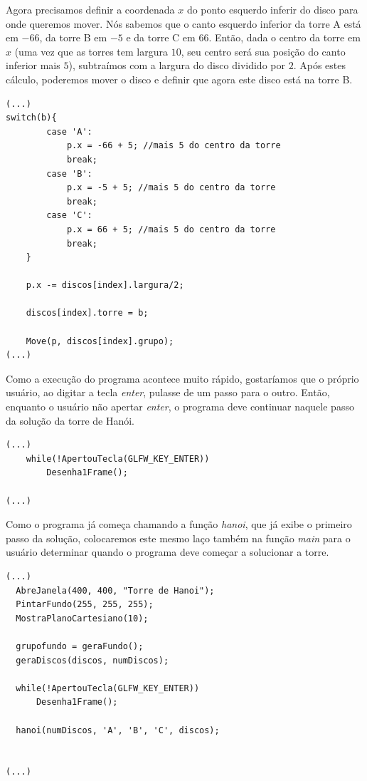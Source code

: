 Agora precisamos definir a coordenada $x$ do ponto esquerdo inferir do disco para onde queremos mover. Nós sabemos que o canto esquerdo inferior da torre A está em $-66$, da torre B em $-5$ e da torre C em $66$. Então, dada o centro da torre em $x$ (uma vez que as torres tem largura $10$, seu centro será sua posição do canto inferior mais $5$), subtraímos com a largura do disco dividido por $2$. Após estes cálculo, poderemos mover o disco e definir que agora este disco está na torre B.

 \begin{lstlisting}[caption={Determinando a posição em $x$ do disco.}, style=tuto] 
 (...)
switch(b){
        case 'A':
            p.x = -66 + 5; //mais 5 do centro da torre
            break;
        case 'B':
            p.x = -5 + 5; //mais 5 do centro da torre
            break;
        case 'C':
            p.x = 66 + 5; //mais 5 do centro da torre
            break;
    }

    p.x -= discos[index].largura/2;

    discos[index].torre = b;

    Move(p, discos[index].grupo);
(...)
\end{lstlisting}

Como a execução do programa acontece muito rápido, gostaríamos que o próprio usuário, ao digitar a tecla \emph{enter}, pulasse de um passo para o outro. Então, enquanto o usuário não apertar \emph{enter}, o programa deve continuar naquele passo da solução da torre de Hanói.

\begin{lstlisting}[caption={Laço para pegar entrada do usuário.}, style=tuto] 
 (...)
    while(!ApertouTecla(GLFW_KEY_ENTER))
        Desenha1Frame();

(...)
\end{lstlisting}

Como o programa já começa chamando a função \emph{hanoi}, que já exibe o primeiro passo da solução, colocaremos este mesmo laço também na função \emph{main} para o usuário determinar quando o programa deve começar a solucionar a torre.

\begin{lstlisting}[caption={Laço para esperar o usuário querer começar a solução.}, style=tuto] 
 (...)
  AbreJanela(400, 400, "Torre de Hanoi");
  PintarFundo(255, 255, 255);
  MostraPlanoCartesiano(10);

  grupofundo = geraFundo();
  geraDiscos(discos, numDiscos);
    
  while(!ApertouTecla(GLFW_KEY_ENTER))
      Desenha1Frame();

  hanoi(numDiscos, 'A', 'B', 'C', discos);


(...)
\end{lstlisting}

